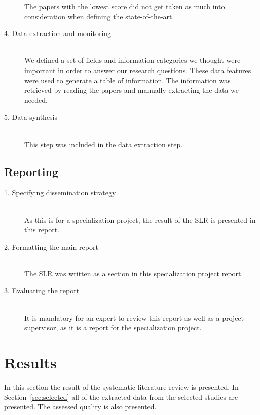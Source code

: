 \begin{description}
		The papers with the lowest score did not get taken as much into consideration when defining the state-of-the-art. 
		
	\item[4. Data extraction and monitoring] \hfill \\
		We defined a set of fields and information categories we thought were important in order to answer our research questions. These data features were used to generate a table of information. The information was retrieved by reading the papers and manually extracting the data we needed.
	

	\item[5. Data synthesis] \hfill \\
		This step was included in the data extraction step.
\end{description}


\subsection{Reporting}


\begin{description}

	\item[1. Specifying dissemination strategy] \hfill \\
		As this is for a specialization project, the result of the SLR is presented in this report.  

	\item[2. Formatting the main report] \hfill \\
		The SLR was written as a section in this specialization project report. 

	\item[3. Evaluating the report] \hfill \\
		It is mandatory for an expert to review this report as well as a project supervisor, as it is a report for the specialization project.

\end{description}

\section{Results}
\label{sec:slrresults}

In this section the result of the systematic literature review is presented. In Section~\ref{sec:selected} all of the extracted data from the selected studies are presented. The assessed quality is also presented. 


